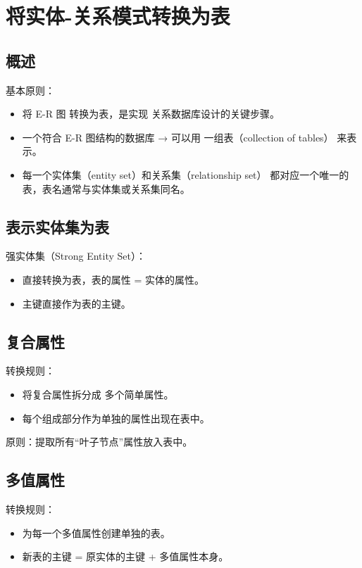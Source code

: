 \section{将实体-关系模式转换为表}

\subsection{概述}

基本原则：
\begin{itemize}
    \item 将 E-R 图 转换为表，是实现 关系数据库设计的关键步骤。
    \item 一个符合 E-R 图结构的数据库 → 可以用 一组表（collection of tables） 来表示。
    \item 每一个实体集（entity set）和关系集（relationship set） 都对应一个唯一的表，表名通常与实体集或关系集同名。
\end{itemize}

\subsection{表示实体集为表}

强实体集（Strong Entity Set）：
\begin{itemize}
    \item 直接转换为表，表的属性 = 实体的属性。
    \item 主键直接作为表的主键。
\end{itemize}

\subsection{复合属性}

转换规则：
\begin{itemize}
    \item 将复合属性拆分成 多个简单属性。
    \item 每个组成部分作为单独的属性出现在表中。
\end{itemize}

原则：提取所有“叶子节点”属性放入表中。

\subsection{多值属性}

转换规则：
\begin{itemize}
    \item 为每一个多值属性创建单独的表。
    \item 新表的主键 = 原实体的主键 + 多值属性本身。
\end{itemize}

